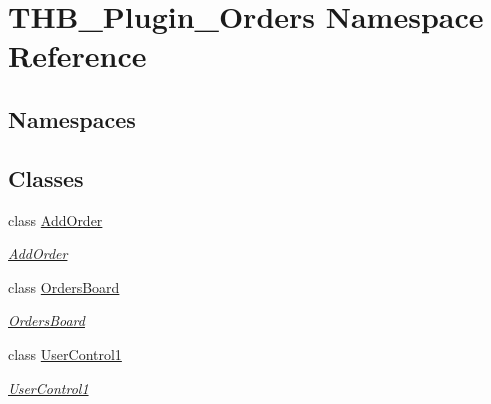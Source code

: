 \hypertarget{namespace_t_h_b___plugin___orders}{}\section{T\+H\+B\+\_\+\+Plugin\+\_\+\+Orders Namespace Reference}
\label{namespace_t_h_b___plugin___orders}
\subsection*{Namespaces}
\begin{DoxyCompactItemize}
\end{DoxyCompactItemize}
\subsection*{Classes}
\begin{DoxyCompactItemize}
\item 
class \mbox{\hyperlink{class_t_h_b___plugin___orders_1_1_add_order}{Add\+Order}}
\begin{DoxyCompactList}\small\item\em \mbox{\hyperlink{class_t_h_b___plugin___orders_1_1_add_order}{Add\+Order}} \end{DoxyCompactList}\item 
class \mbox{\hyperlink{class_t_h_b___plugin___orders_1_1_orders_board}{Orders\+Board}}
\begin{DoxyCompactList}\small\item\em \mbox{\hyperlink{class_t_h_b___plugin___orders_1_1_orders_board}{Orders\+Board}} \end{DoxyCompactList}\item 
class \mbox{\hyperlink{class_t_h_b___plugin___orders_1_1_user_control1}{User\+Control1}}
\begin{DoxyCompactList}\small\item\em \mbox{\hyperlink{class_t_h_b___plugin___orders_1_1_user_control1}{User\+Control1}} \end{DoxyCompactList}\end{DoxyCompactItemize}
